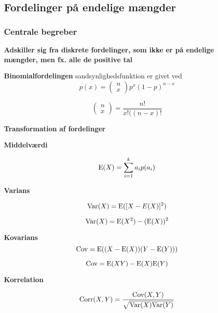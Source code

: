 

\horizline

\subsection{Fordelinger på endelige mængder}


\subsubsection{Centrale begreber}

\textbf{Adskiller sig fra diskrete fordelinger, som ikke er på endelige mængder, men fx. alle de positive tal}

\textbf{Binomialfordelingen} sandsynlighedsfunktion er givet ved
\begin{equation}
    p(x) =\begin{pmatrix}
    n \\
    x \end{pmatrix}p^x(1-p)^{n-x}
\end{equation}

\begin{equation}
    \begin{pmatrix}
    n \\ x \end{pmatrix} = \frac{n!}{x!((n-x)!}
\end{equation}

\textbf{Transformation af fordelinger}

\textbf{Middelværdi}

\begin{equation}
    \text{E}(X) =  \sum_{i=1}^k a_i p(a_i)
\end{equation}

\textbf{Varians}

\begin{equation}
    \text{Var} (X) = \text{E}([X - E(X)]^2)
\end{equation}

\begin{equation}
    \text{Var} (X) = \text{E}(X^2) - (\text{E}(X))^2
\end{equation}

\textbf{Kovarians}
\begin{equation}
    \text{Cov} = \text{E}((X - \text{E}(X))(Y - \text{E}(Y)))
\end{equation}

\begin{equation}
    \text{Cov} = \text{E}(XY) - \text{E}(X)\text{E}(Y)
\end{equation}

\textbf{Korrelation}

\begin{equation}
    \text{Corr}(X,Y) = \frac{\text{Cov}(X,Y)}{\sqrt{\text{Var}(X)\text{Var}(Y)}}
\end{equation}


